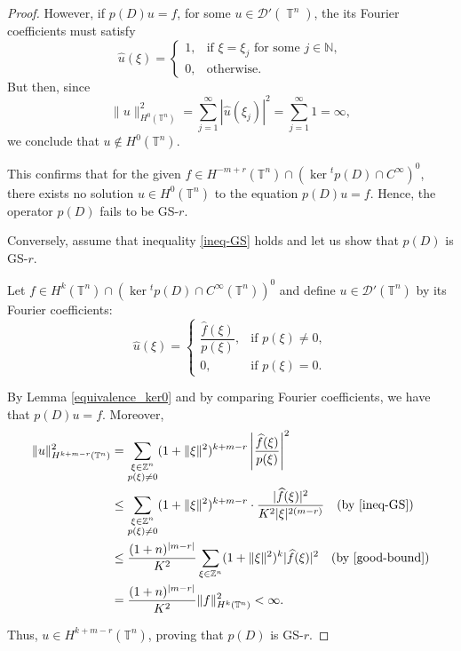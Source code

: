 \documentclass[11pt]{amsart}
\numberwithin{equation}{section}
\theoremstyle{definition}
\DeclareMathOperator{\T}{\mathbb{T}}
\begin{document}
\begin{proof}
        However, if $p(D)u=f$, for some $u\in\mathscr{D}'(\T^n)$, the its Fourier coefficients must satisfy
		\[
		\widehat{u}(\xi) = 
		\begin{cases}
			1, & \text{if } \xi = \xi_j \text{ for some } j \in \mathbb{N}, \\
			0, & \text{otherwise}.
		\end{cases}
		\]
		But then, since
		\[
		\|u\|_{H^0(\mathbb{T}^n)}^2 = \sum_{j=1}^\infty |\widehat{u}(\xi_j)|^2 = \sum_{j=1}^\infty 1 = \infty,
		\]
		we conclude that \( u \notin H^0(\mathbb{T}^n) \).
			
		This confirms that for the given \( f \in H^{-m + r}(\mathbb{T}^n) \cap \left( \ker {}^t p(D) \cap C^\infty \right)^0 \), there exists no solution \( u \in H^{0}(\mathbb{T}^n) \) to the equation \( p(D)u = f \). Hence, the operator \( p(D) \) fails to be GS-\( r \).

		\medskip		
		Conversely, assume that inequality \eqref{ineq-GS} holds and let us show that \( p(D) \) is GS-\( r \). 
		
		Let \( f \in H^{k}(\mathbb{T}^n) \cap \left( \ker {}^t p(D) \cap C^\infty(\mathbb{T}^n) \right)^0 \) and define \( u \in \mathscr{D}'(\mathbb{T}^n) \) by its Fourier coefficients:
		\[
		\widehat{u}(\xi) = 
		\begin{cases}
			\dfrac{\widehat{f}(\xi)}{p(\xi)}, & \text{if } p(\xi) \neq 0, \\
			0, & \text{if } p(\xi) = 0.
		\end{cases}
		\]
		
		By Lemma \ref{equivalence_ker0} and by comparing Fourier coefficients, we have that \( p(D)u = f \). Moreover, 
		\begin{align*}
			\|u\|_{H^{k + m - r}(\mathbb{T}^n)}^2 
			&= \sum_{\substack{\xi \in \mathbb{Z}^n \\ p(\xi) \neq 0}} (1 + \|\xi\|^2)^{k + m - r} \left| \frac{\widehat{f}(\xi)}{p(\xi)} \right|^2 \\
			&\leq \sum_{\substack{\xi \in \mathbb{Z}^n \\ p(\xi) \neq 0}} (1 + \|\xi\|^2)^{k + m - r} \cdot \frac{|\widehat{f}(\xi)|^2}{K^2 |\xi|^{2(m - r)}} \quad \text{(by \eqref{ineq-GS})} \\
			& \leq \frac{(1 + n)^{|m - r|}}{K^2} \sum_{\xi \in \mathbb{Z}^n} (1 + \|\xi\|^2)^{k} |\widehat{f}(\xi)|^2  \quad \text{(by \eqref{good-bound})} \\
			&= \frac{(1 + n)^{|m - r|}}{K^2} \|f\|_{H^k(\mathbb{T}^n)}^2 < \infty.
		\end{align*}
		
		Thus, \( u \in H^{k + m - r}(\mathbb{T}^n) \), proving that \( p(D) \) is GS-\( r \). 
	\end{proof}
      
\end{document}
